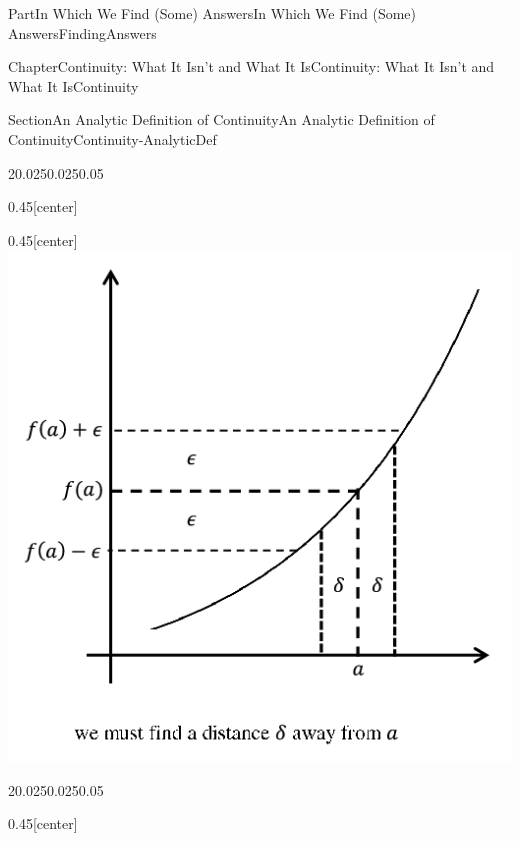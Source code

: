 \documentclass[oneside,10pt,]{book}
\numberwithin{equation}{part}
\begin{document}
\begin{partptx}{Part}{In Which We Find (Some) Answers}{}{In Which We Find (Some) Answers}{}{}{FindingAnswers}
\begin{chapterptx}{Chapter}{Continuity: What It Isn't and What It Is}{}{Continuity: What It Isn't and What It Is}{}{}{Continuity}
\begin{sectionptx}{Section}{An Analytic Definition of Continuity}{}{An Analytic Definition of Continuity}{}{}{Continuity-AnalyticDef}
\begin{sidebyside}{2}{0.025}{0.025}{0.05}
\begin{sbspanel}{0.45}[center]
\end{sbspanel}%
\begin{sbspanel}{0.45}[center]%
\includegraphics[width=\linewidth]{external/images/Ch5fig3b.png}
\end{sbspanel}%
\end{sidebyside}%
\begin{sidebyside}{2}{0.025}{0.025}{0.05}%
\begin{sbspanel}{0.45}[center]%

\end{sbspanel}
\end{sidebyside}
\end{sectionptx}
\end{chapterptx}
\end{partptx}
\end{document}
